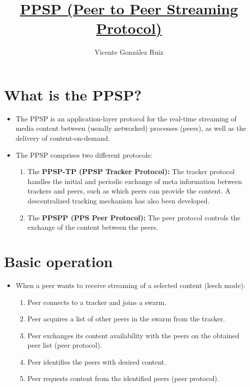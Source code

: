 \title{\href{https://datatracker.ietf.org/wg/ppsp}{PPSP (Peer to Peer Streaming Protocol)}}
\author{Vicente González Ruiz}

\maketitle
\tableofcontents

\section{What is the PPSP?}

\begin{itemize}
\item The PPSP is an application-layer protocol for the real-time
  streaming of media content between (usually networked) processes
  (peers), as well as the delivery of content-on-demand.
\item The PPSP comprises two different protocols:
  \begin{enumerate}
  \item The \textbf{PPSP-TP (PPSP Tracker Protocol):} The tracker
    protocol handles the initial and periodic exchange of meta
    information between trackers and peers, such as which peers can
    provide the content. A descentralized tracking mechanism has also
    been developed.
  \item The \textbf{PPSPP (PPS Peer Protocol):} The peer protocol
    controls the exchange of the content between the peers.
  \end{enumerate}
\end{itemize}


\section{Basic operation}

\begin{itemize}
\item When a peer wants to receive streaming of a selected content (leech
   mode):
\begin{enumerate}
\item Peer connects to a tracker and joins a swarm.
\item Peer acquires a list of other peers in the swarm from the tracker.
\item Peer exchanges its content availability with the peers on the
  obtained peer list (peer protocol).
\item Peer identifies the peers with desired content.
\item Peer requests content from the identified peers (peer protocol).
\end{enumerate}
\end{itemize}

